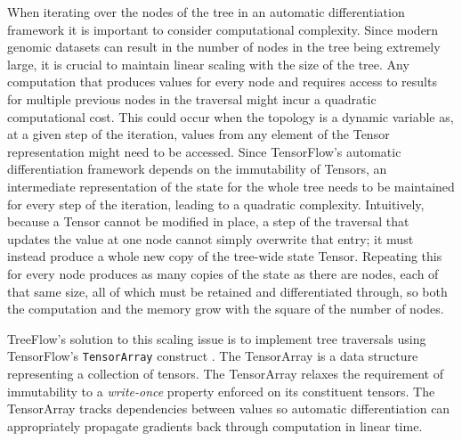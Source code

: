 \documentclass[oupdraft]{sysbio_sse}
\let\cite\citep
\begin{document}
When iterating over the nodes of the tree in an automatic differentiation framework it is important to consider computational complexity. Since modern genomic datasets can result in the number of nodes in the tree being extremely large, it is crucial to maintain linear scaling with the size of the tree. Any computation that produces values for every node and requires access to results for multiple previous nodes in the traversal might incur a quadratic computational cost. This could occur when the topology is a dynamic variable as, at a given step of the iteration, values from any element of the Tensor representation might need to be accessed. Since TensorFlow's automatic differentiation framework depends on the immutability of Tensors, an intermediate representation of the state for the whole tree needs to be maintained for every step of the iteration, leading to a quadratic complexity. Intuitively, because a Tensor cannot be modified in place, a step of the traversal that updates the value at one node cannot simply overwrite that entry; it must instead produce a whole new copy of the tree-wide state Tensor. Repeating this for every node produces as many copies of the state as there are nodes, each of that same size, all of which must be retained and differentiated through, so both the computation and the memory grow with the square of the number of nodes.

TreeFlow's solution to this scaling issue is to implement tree traversals using TensorFlow's \texttt{TensorArray} construct \cite{yu2018dynamic}. The TensorArray is a data structure representing a collection of tensors. The TensorArray relaxes the requirement of immutability to a \textit{write-once} property enforced on its constituent tensors. The TensorArray tracks dependencies between values so automatic differentiation can appropriately propagate gradients back through computation in linear time.
\end{document}
